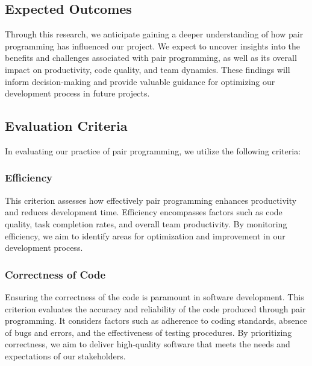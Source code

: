 \subsection{Expected Outcomes}
Through this research, we anticipate gaining a deeper understanding of how pair programming has influenced our project. We expect to uncover insights into the benefits and challenges associated with pair programming, as well as its overall impact on productivity, code quality, and team dynamics. These findings will inform decision-making and provide valuable guidance for optimizing our development process in future projects.

\subsection{Evaluation Criteria}

In evaluating our practice of pair programming, we utilize the following criteria:

\subsubsection{Efficiency} 
This criterion assesses how effectively pair programming enhances productivity and reduces development time. Efficiency encompasses factors such as code quality, task completion rates, and overall team productivity. By monitoring efficiency, we aim to identify areas for optimization and improvement in our development process.

\subsubsection{Correctness of Code} 
Ensuring the correctness of the code is paramount in software development. This criterion evaluates the accuracy and reliability of the code produced through pair programming. It considers factors such as adherence to coding standards, absence of bugs and errors, and the effectiveness of testing procedures. By prioritizing correctness, we aim to deliver high-quality software that meets the needs and expectations of our stakeholders.
